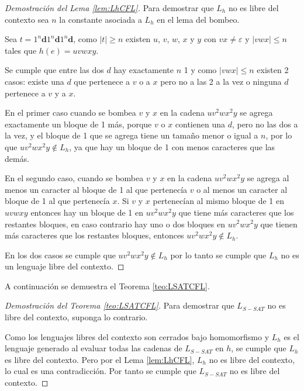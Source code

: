 \documentclass[12pt]{article}
\begin{document}
\begin{proof}[Demostración del Lema \ref{lem:LhCFL}]
    Para demostrar que $L_h$ no es libre del contexto sea $n$ la constante asociada a $L_h$ en el lema del bombeo.
    
    Sea $t=1^n\mathbf{d}1^n\mathbf{d}1^n\mathbf{d}$, como $|t|\geq n$ existen $u$, $v$, $w$, $x$ y $y$ con $vx\neq \varepsilon$ y $|vwx|\leq n$
    tales que $h(e)=uvwxy$.
    
    Se cumple que entre las dos $d$ hay exactamente $n$ 1 y como $|vwx|\leq n$ existen 2 casos: existe una $d$ que pertenece a
    $v$ o a $x$ pero no a las 2 a la vez o ninguna $d$ pertenece a $v$ y a $x$.
    
    En el primer caso cuando se bombea $v$ y $x$ en la cadena $uv^2wx^2y$ se agrega exactamente un bloque de 1 más, porque $v$ o $x$ contienen una $d$, pero no las dos a la vez, y el bloque de 1
    que se agrega tiene un tamaño menor o igual a $n$, por lo que $uv^2wx^2y\notin L_h$, ya que hay un bloque de 1
    con menos caracteres que las demás.
    
    En el segundo caso, cuando se bombea $v$ y $x$ en la cadena $uv^2wx^2y$ se agrega al menos un caracter al bloque de 1 al que pertenecía 
    $v$ o al menos un caracter al bloque de 1 al que pertenecía $x$.  Si $v$ y $x$ pertenecían al mismo bloque 
    de 1 en $uvwxy$ entonces hay un bloque de 1 en $uv^2wx^2y$ que tiene más caracteres que los restantes 
    bloques, en caso contrario hay uno o dos bloques en $uv^2wx^2y$ que tienen más caracteres que los restantes 
    bloques, entonces $uv^2wx^2y\notin L_{h}$.
    
    En los dos casos se cumple que $uv^2wx^2y\notin L_h$ por lo tanto se cumple que $L_h$ no es un lenguaje libre del contexto.
\end{proof}

A continuación se demuestra el Teorema \ref{teo:LSATCFL}.

\begin{proof}[Demostración del Teorema \ref{teo:LSATCFL}]
    Para demostrar que $L_{S-SAT}$ no es libre del contexto, suponga lo contrario. 
    
    Como los lenguajes libres del contexto
    son cerrados bajo homomorfismo y $L_h$ es el lenguaje generado al evaluar todas las cadenas de $L_{S-SAT}$ en $h$, se cumple
    que $L_h$ es libre del contexto. Pero por el Lema \ref{lem:LhCFL}, $L_h$ no es libre del contexto, lo cual es una contradicción.
    Por tanto se cumple que $L_{S-SAT}$ no es libre del contexto.
\end{proof}
\end{document}
